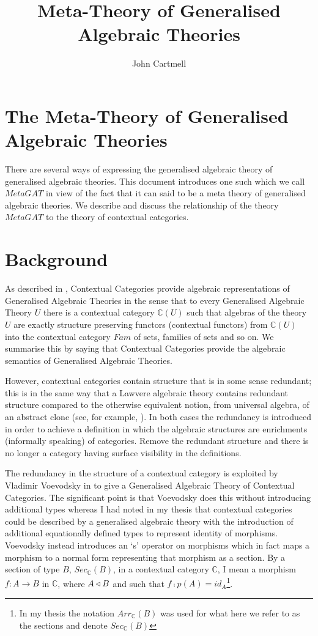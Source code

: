 \documentclass[10pt,a4paper]{article}
\title{Meta-Theory of Generalised Algebraic Theories}
\author{John Cartmell}
\begin{document}
\maketitle

\section{The Meta-Theory of Generalised Algebraic Theories}
There are several ways of expressing the generalised algebraic 
theory of generalised algebraic theories.  This document introduces one such  
which we call $MetaGAT$ in view of the fact that it can said to be a meta theory of generalised algebraic theories. We describe and discuss the relationship of the theory $MetaGAT$ to the theory of contextual categories.  

\section{Background}
As described in \cite{Cartmell86}, Contextual Categories provide algebraic representations of Generalised Algebraic Theories  in the sense that to every Generalised Algebraic Theory $U$ there is a contextual category $\mathbb{C}(U)$ such that algebras of the theory $U$ are exactly structure preserving functors (contextual functors)  from $\mathbb{C}(U)$ into the contextual category $Fam$ of sets, families of sets and so on. We summarise this by saying that Contextual Categories provide the algebraic semantics of Generalised Algebraic Theories. 

However, contextual categories contain structure that is in some sense redundant; this is in the same way that a Lawvere algebraic theory contains redundant structure compared to the otherwise equivalent notion, from universal algebra, of an abstract clone (see, for example, \cite{KerkoffonClones}). In both cases the redundancy is introduced in order to achieve a definition in which the algebraic structures 
 are enrichments (informally speaking) of categories. Remove the redundant structure and there is no longer a category having surface visibility in the definitions. 

The redundancy in the structure of a contextual category is exploited by Vladimir Voevodsky in \cite{Voevodsky14C} to give a Generalised Algebraic Theory of Contextual Categories. The significant point is that Voevodsky does this without introducing additional types whereas I had noted in my thesis \cite{Cartmell78} that contextual categories could be described by a generalised algebraic theory with the introduction of additional equationally defined types to represent identity of morphisms. Voevodsky instead introduces an  `s' operator on morphisms which in fact maps a morphism to a normal form representing that morphism as a section. By a section of type $B$, $Sec_{\mathbb{C}}(B)$, in a contextual category $\mathbb{C}$, I mean a morphism $f:A\rightarrow B$ in $\mathbb{C}$, where 
$A \triangleleft B$ and such that $f \comp p(A) = id_A$\footnote{In my thesis the notation $Arr_{\mathbb{C}}(B)$ was used for what here we refer to as the sections and denote $Sec_{\mathbb{C}}(B)$}.
\end{document}
